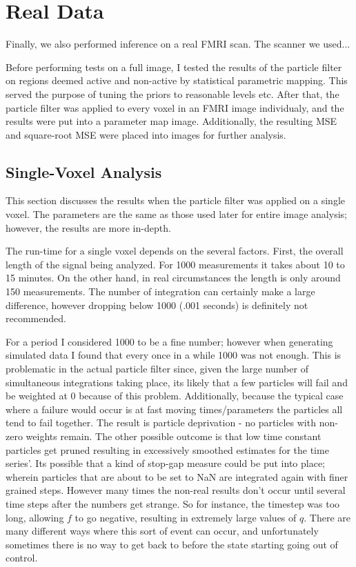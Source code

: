 \chapter{Real Data}
Finally, we also performed inference on a real FMRI scan. The scanner we used...

Before performing tests on a full image, I tested the results of the particle filter
on regions deemed active and non-active by statistical parametric mapping. 
This served the purpose of tuning the priors to reasonable levels etc.
After that, the particle filter was applied to every voxel in an FMRI 
image individualy, and the results were put into a parameter map 
image. Additionally, the resulting MSE and square-root MSE were placed
into images for further analysis.

\section{Single-Voxel Analysis}
This section discusses the results when the particle filter was
applied on a single voxel. The parameters are the same as
those used later for entire image analysis; however, the results
are more in-depth. 

The run-time for a single voxel depends on the several factors. First, the
overall length of the signal being analyzed. For 1000 measurements it takes
about 10 to 15 minutes. On the other hand, in real circumstances the
length is only around 150 measurements. The number of  integration
can certainly make a large difference, however dropping below 1000 (.001 seconds)
is definitely not recommended. 

For a period I considered 1000 to be a
fine number; however when generating simulated data I found that every once
in a while 1000 was not enough. This is problematic in the actual particle
filter since, given the large number of simultaneous integrations taking 
place, its likely that a few particles will fail and be weighted at 0 because
of this problem. Additionally, because the typical case where a failure would
occur is at fast moving times/parameters the particles all tend to fail together.
The result is particle deprivation - no particles with non-zero weights remain.
The other possible outcome is that low time constant particles get pruned resulting
in excessively smoothed estimates for the time series'. Its possible that a
kind of stop-gap measure could be put into place; wherein particles that are
about to be set to NaN are integrated again with finer grained steps. However
many times the non-real results don't occur until several time steps after the 
numbers get strange. So for instance, the timestep was too long, allowing 
$f$ to go negative, resulting in extremely large values of $q$. There are many
different ways where this sort of event can occur, and unfortunately sometimes
there is no way to get back to before the state starting going out of control.

